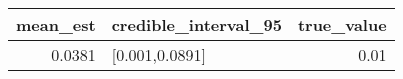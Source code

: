 \begin{longtable}{rlr}
\toprule
mean\_est & credible\_interval\_95 & true\_value \\ 
\midrule
0.0381 & [0.001,0.0891] & 0.01 \\ 
\bottomrule
\end{longtable}

